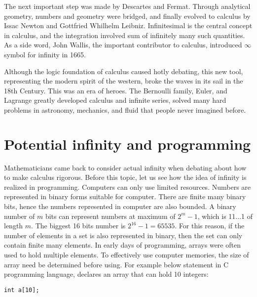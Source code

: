 \documentclass{article}
\begin{document}
The next important step was made by Descartes and Fermat. Through analytical geometry, numbers and geometry were bridged, and finally evolved to calculus by Issac Newton and Gottfried Whilhelm Leibniz. Infinitesimal is the central concept in calculus, and the integration involved sum of infinitely many such quantities. As a side word, John Wallis, the important contributor to calculus, introduced $\infty$ symbol for infinity in 1665.

Although the logic foundation of calculus caused hotly debating, this new tool, representing the modern spirit of the western, broke the waves in its sail in the 18th Century. This was an era of heroes. The Bernoulli family, Euler, and Lagrange greatly developed calculus and infinite series, solved many hard problems in astronomy, mechanics, and fluid that people never imagined before.

\section{Potential infinity and programming}
Mathematicians came back to consider actual infinity when debating about how to make calculus rigorous. Before this topic, let us see how the idea of infinity is realized in programming. Computers can only use limited resources. Numbers are represented in binary forms suitable for computer. There are finite many binary bits, hence the numbers represented in computer are also bounded. A binary number of $m$ bits can represent numbers at maximum of $2^m - 1$, which is 11...1 of length $m$. The biggest 16 bits number is $2^{16} - 1 = 65535$. For this reason, if the number of elements in a set is also represented in binary, then the set can only contain finite many elements. In early days of programming, arrays were often used to hold multiple elements. To effectively use computer memories, the size of array need be determined before using. For example below statement in C programming language, declares an array that can hold 10 integers:

\begin{verbatim}
int a[10];
\end{verbatim}
\end{document}
